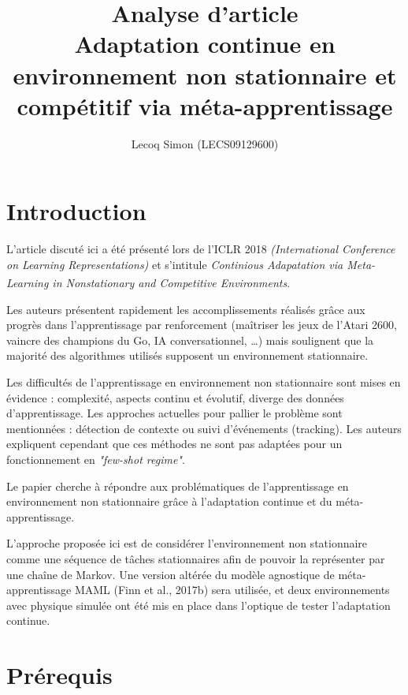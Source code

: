 \documentclass[a4paper,11pt]{article}
\title{Analyse d'article\\\large Adaptation continue en environnement non stationnaire et compétitif via méta-apprentissage}
\author{Lecoq Simon (LECS09129600)}
\date{}
\begin{document}
    \maketitle
  
    \setlength{\parindent}{0ex}
    \setlength{\parskip}{1em}

    \section{Introduction}
    L’article discuté ici a été présenté lors de l’ICLR 2018 
    \textit{(International Conference on Learning Representations)} et s’intitule 
    \textit{Continious Adapatation via Meta-Learning in Nonstationary and Competitive 
    Environments}\textsuperscript{\cite{paper}}.

    Les auteurs présentent rapidement les accomplissements réalisés grâce aux progrès dans 
    l’apprentissage par renforcement (maîtriser les jeux de l’Atari 2600, vaincre des champions
    du Go, IA conversationnel, …) mais soulignent que la majorité des algorithmes utilisés 
    supposent un environnement stationnaire.

    Les difficultés de l’apprentissage en environnement non stationnaire sont mises 
    en évidence : complexité, aspects continu et évolutif, diverge des données d'apprentissage. 
    Les approches actuelles pour pallier le problème sont mentionnées : détection de contexte ou 
    suivi d’événements (tracking). Les auteurs expliquent cependant 
    que ces méthodes ne sont pas adaptées pour un fonctionnement en \textit{"few-shot regime"}. 
    
    Le papier cherche à répondre aux problématiques de l'apprentissage en environnement non 
    stationnaire grâce à l'adaptation continue et du méta-apprentissage.

    L'approche proposée ici est de considérer l'environnement non stationnaire comme une 
    séquence de tâches stationnaires afin de pouvoir la représenter par une chaîne de Markov. 
    Une version altérée du modèle agnostique de méta-apprentissage MAML (Finn et al., 2017b) sera 
    utilisée, et deux environnements avec physique simulée ont été mis en place dans l'optique de 
    tester l'adaptation continue.


    \section{Prérequis}
\end{document}
